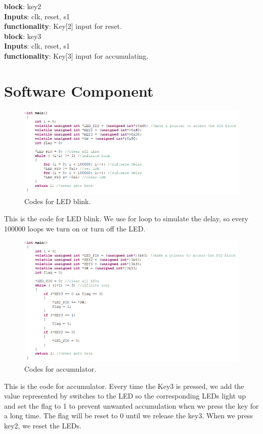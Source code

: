 \documentclass[12pt]{article}
\begin{document}
\textbf{block}: key2 \\
\textbf{Inputs}: clk, reset, s1 \\
\textbf{functionality}: Key[2] input for reset. \\

\textbf{block}: key3 \\
\textbf{Inputs}: clk, reset, s1 \\
\textbf{functionality}: Key[3] input for accumulating. \\

\section{Software Component}
\begin{figure}[H]
    \centering
    \includegraphics[width=16cm]{LED_blink.png}
    \caption{Codes for LED blink.}
\end{figure}
This is the code for LED blink. We use for loop to simulate the delay, so every 100000 loops we turn on or turn off the LED.

\begin{figure}[H]
    \centering
    \includegraphics[width=16cm]{Accumulator.png}
    \caption{Codes for accumulator.}
\end{figure}
This is the code for accumulator. Every time the Key3 is pressed, we add the value represented by switches to the LED so the corresponding LEDs light up and set the flag to 1 to prevent unwanted accumulation when we press the key for a long time. The flag will be reset to 0 until we release the key3. When we press key2, we reset the LEDs.
\end{document}

